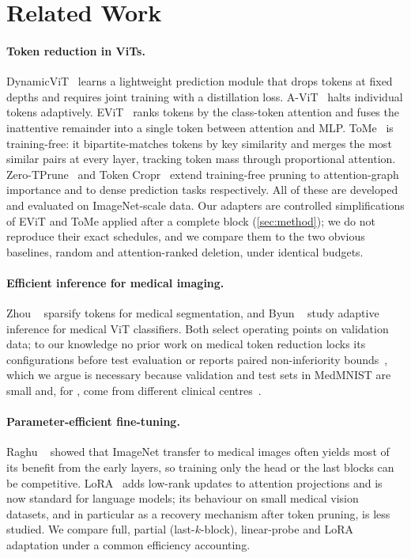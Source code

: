 \section{Related Work}
\label{sec:related}

\paragraph{Token reduction in ViTs.}
DynamicViT~\cite{rao2021dynamicvit} learns a lightweight prediction module that drops tokens at fixed depths and requires joint training with a distillation loss. A-ViT~\cite{yin2022avit} halts individual tokens adaptively. EViT~\cite{liang2022evit} ranks tokens by the class-token attention and fuses the inattentive remainder into a single token between attention and MLP. ToMe~\cite{bolya2023tome} is training-free: it bipartite-matches tokens by key similarity and merges the most similar pairs at every layer, tracking token mass through proportional attention. Zero-TPrune~\cite{wang2024zerotprune} and Token Cropr~\cite{bergner2025cropr} extend training-free pruning to attention-graph importance and to dense prediction tasks respectively. All of these are developed and evaluated on ImageNet-scale data. Our adapters are controlled simplifications of EViT and ToMe applied after a complete block (\cref{sec:method}); we do not reproduce their exact schedules, and we compare them to the two obvious baselines, random and attention-ranked deletion, under identical budgets.

\paragraph{Efficient inference for medical imaging.}
Zhou \etal~\cite{zhou2023tokensparse} sparsify tokens for medical segmentation, and Byun \etal~\cite{byun2026adaptive} study adaptive inference for medical ViT classifiers. Both select operating points on validation data; to our knowledge no prior work on medical token reduction locks its configurations before test evaluation or reports paired non-inferiority bounds~\cite{walker2011noninferiority}, which we argue is necessary because validation and test sets in MedMNIST are small and, for \pathmnist, come from different clinical centres~\cite{yang2023medmnist}.

\paragraph{Parameter-efficient fine-tuning.}
Raghu \etal~\cite{raghu2019transfusion} showed that ImageNet transfer to medical images often yields most of its benefit from the early layers, so training only the head or the last blocks can be competitive. LoRA~\cite{hu2022lora} adds low-rank updates to attention projections and is now standard for language models; its behaviour on small medical vision datasets, and in particular as a recovery mechanism after token pruning, is less studied. We compare full, partial (last-$k$-block), linear-probe and LoRA adaptation under a common efficiency accounting.
